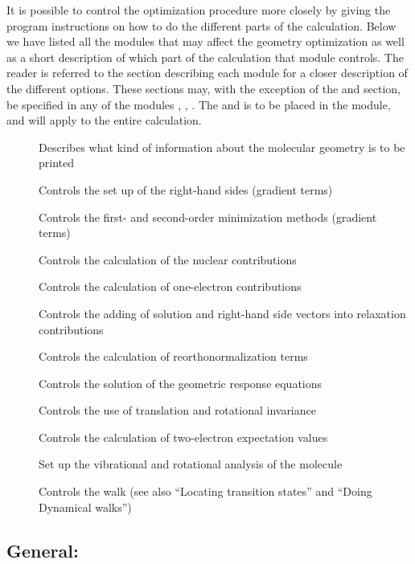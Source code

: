 It is possible to control the optimization procedure more closely
by giving the program instructions on how to do the different parts of
the calculation. Below we have listed all the modules that may
affect the geometry optimization  as well as a short description of
which part of the calculation that module controls. The reader is
referred to the section describing each module for a closer
description of the different options. These sections may, with the
exception of the  and  section, be specified
in any of the modules , ,
. The  and  is
to be placed in the  module, and will apply to the
entire calculation.

\begin{description}
\item[] Describes what kind  of information about the
molecular geometry is to be printed 
\item[] Controls the set up of the right-hand sides
(gradient terms) 
\item[] Controls the first- and second-order
minimization methods
(gradient terms) 
\item[] Controls the calculation of the nuclear contributions
\item[] Controls the calculation of one-electron contributions
\item[] Controls the adding of solution and right-hand side vectors
into relaxation contributions
\item[] Controls the calculation of reorthonormalization terms
\item[] Controls the solution of the geometric response equations
\item[] Controls the use of translation and rotational invariance
\item[] Controls the calculation of two-electron
expectation values 
\item[] Set up the vibrational and rotational analysis of the
molecule
\item[] Controls the walk (see also ``Locating transition
states'' and ``Doing Dynamical walks'')
\end{description}

\subsection{General: }\label{subsec:minimize}


